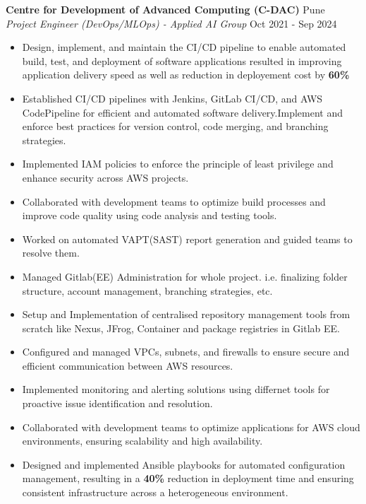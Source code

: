 \documentclass[a4paper]{article}
\begin{document}
\vspace*{2mm}

\vspace{1mm}
\textbf{Centre for Development of Advanced Computing (C-DAC)} \hfill Pune\\
\textit{Project Engineer (DevOps/MLOps) - Applied AI Group} \hfill Oct 2021 - Sep 2024\\
\vspace{-1mm}
\begin{itemize} \itemsep 1pt
    \item Design, implement, and maintain the CI/CD pipeline to enable automated build, test, and deployment of software applications resulted in improving application delivery speed as well as reduction in deployement cost by \textbf{60\%}
    \item Established CI/CD pipelines with Jenkins, GitLab CI/CD, and AWS CodePipeline for efficient and automated software delivery.Implement and enforce best practices for version control, code merging, and branching strategies.
    \item Implemented IAM policies to enforce the principle of least privilege and enhance security across AWS projects.
    \item Collaborated with development teams to optimize build processes and improve code quality using code analysis and testing tools.
    \item Worked on automated VAPT(SAST) report generation and guided teams to resolve them. 
    \item Managed Gitlab(EE) Administration for whole project. i.e. finalizing folder structure, account management, branching strategies, etc.
    \item Setup and Implementation of centralised repository management tools from scratch like Nexus, JFrog, Container and package registries in Gitlab EE.
    \item Configured and managed VPCs, subnets, and firewalls to ensure secure and efficient communication between AWS resources.
    \item Implemented monitoring and alerting solutions using differnet tools for proactive issue identification and resolution.
    \item Collaborated with development teams to optimize applications for AWS cloud environments, ensuring scalability and high availability.
    \item Designed and implemented Ansible playbooks for automated configuration management, resulting in a \textbf{40\%} reduction in deployment time and ensuring consistent infrastructure across a heterogeneous environment.

\end{itemize}
\end{document}

